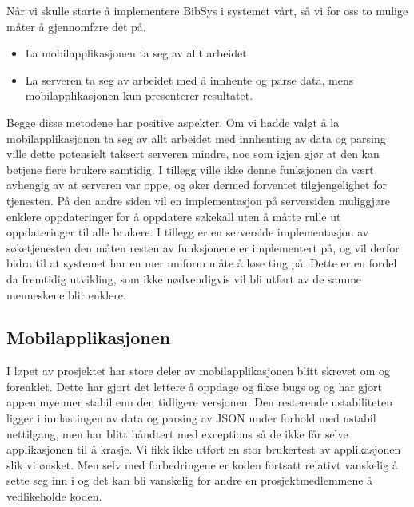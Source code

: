 \documentclass[../main.tex]{subfiles}
\begin{document}
Når vi skulle starte å implementere BibSys i systemet vårt, så vi for oss to mulige måter å gjennomføre det på.
\begin{itemize}
\item La mobilapplikasjonen ta seg av allt arbeidet
\item La serveren ta seg av arbeidet med å innhente og parse data, mens mobilapplikasjonen kun presenterer resultatet.
\end{itemize}
Begge disse metodene har positive aspekter. Om vi hadde valgt å la mobilapplikasjonen ta seg av allt arbeidet med innhenting av data og parsing ville dette potensielt taksert serveren mindre, noe som igjen gjør at den kan betjene flere brukere samtidig. I tillegg ville ikke denne funksjonen da vært avhengig av at serveren var oppe, og øker dermed forventet tilgjengelighet for tjenesten.
På den andre siden vil en implementasjon på serversiden muliggjøre enklere oppdateringer for å oppdatere søkekall uten å måtte rulle ut oppdateringer til alle brukere. I tillegg er en serverside implementasjon av søketjenesten den måten resten av funksjonene er implementert på, og vil derfor bidra til at systemet har en mer uniform måte å løse ting på. Dette er en fordel da fremtidig utvikling, som ikke nødvendigvis vil bli utført av de samme menneskene blir enklere.

\subsection{Mobilapplikasjonen}
I løpet av prosjektet har store deler av mobilapplikasjonen blitt skrevet om og forenklet. Dette har gjort det lettere å oppdage og fikse bugs og og har gjort appen mye mer stabil enn den tidligere versjonen. Den resterende ustabiliteten ligger i innlastingen av data og parsing av JSON under forhold med ustabil nettilgang, men har blitt håndtert med exceptions så de ikke får selve applikasjonen til å krasje. Vi fikk ikke utført en stor brukertest av applikasjonen slik vi ønsket. Men selv med forbedringene er koden fortsatt relativt vanskelig å sette seg inn i og det kan bli vanskelig for andre en prosjektmedlemmene å vedlikeholde koden.
\end{document}
